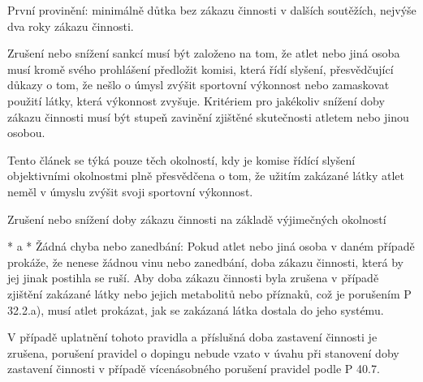 První provinění: minimálně důtka bez zákazu činnosti v dalších soutěžích, nejvýše dva roky zákazu činnosti.

Zrušení nebo snížení sankcí musí být založeno na tom, že atlet nebo jiná osoba musí kromě svého prohlášení předložit komisi, která řídí slyšení, přesvědčující důkazy o tom, že nešlo o úmysl zvýšit sportovní výkonnost nebo zamaskovat použití látky, která výkonnost zvyšuje. Kritériem pro jakékoliv snížení doby zákazu činnosti musí být stupeň zavinění zjištěné skutečnosti atletem nebo jinou osobou.

Tento článek se týká pouze těch okolností, kdy je komise řídící slyšení objektivními okolnostmi plně přesvědčena o tom, že užitím zakázané látky atlet neměl v úmyslu zvýšit svoji sportovní výkonnost.

Zrušení nebo snížení doby zákazu činnosti na základě výjimečných okolností

* \begitems \style a
  * Žádná chyba nebo zanedbání: Pokud atlet nebo jiná osoba v daném případě prokáže, že nenese žádnou vinu nebo zanedbání, doba zákazu činnosti, která by jej jinak postihla se ruší. Aby doba zákazu činnosti byla zrušena v případě zjištění zakázané látky nebo jejich metabolitů  nebo příznaků, což je porušením P 32.2.a), musí atlet prokázat, jak se zakázaná látka dostala do jeho systému.

  V případě uplatnění tohoto pravidla a příslušná doba zastavení činnosti je zrušena, porušení pravidel o dopingu nebude vzato v úvahu při stanovení doby zastavení činnosti v případě vícenásobného porušení pravidel podle P 40.7.

